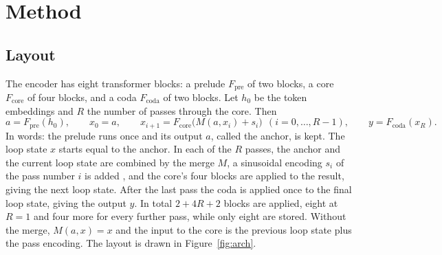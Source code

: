 \documentclass[11pt]{article}
\newcommand{\Fpre}{F_{\mathrm{pre}}}
\newcommand{\Fcore}{F_{\mathrm{core}}}
\newcommand{\Fcoda}{F_{\mathrm{coda}}}
\begin{document}
\section{Method}
\label{sec:method}

\subsection{Layout}

The encoder has eight transformer blocks: a prelude $\Fpre$ of two blocks, a core $\Fcore$ of four blocks, and a coda $\Fcoda$ of two
blocks. Let $h_0$ be the
token embeddings and $R$ the number of passes through the core. Then
\begin{equation}
a = \Fpre(h_0), \qquad x_0 = a, \qquad x_{i+1} = \Fcore\big(M(a, x_i) + s_i\big)\ \ (i = 0,\dots,R-1), \qquad y = \Fcoda(x_R).
\label{eq:layout}
\end{equation}
In words: the prelude runs once and its output $a$, called the anchor, is kept. The loop state $x$ starts equal to the anchor. In each of the $R$
passes, the anchor and the current loop state are combined by the merge $M$, a sinusoidal encoding $s_i$ of the pass number $i$ is added
\citep{vaswani2017attention,dehghani2019universal}, and the core's four blocks are applied to the result, giving the next loop state. After the last
pass the coda is applied once to the final loop state, giving the output $y$. In total $2 + 4R + 2$ blocks are applied, eight at $R = 1$ and
four more for every further pass, while only eight are stored. Without the merge, $M(a, x) = x$ and the input to the core is the previous loop state plus the pass encoding. The layout is drawn in
Figure~\ref{fig:arch}.
\end{document}
